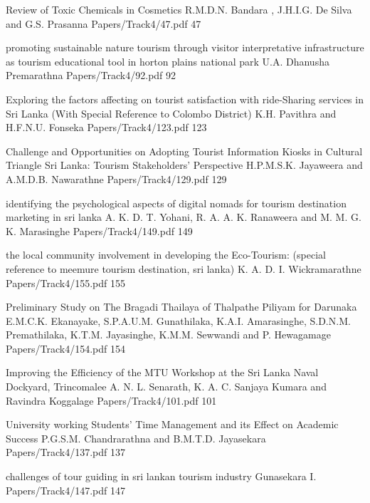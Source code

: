 \addpaper
{Review of Toxic Chemicals in Cosmetics}
{R.M.D.N. Bandara , J.H.I.G. De Silva and G.S. Prasanna}
{Papers/Track4/47.pdf}
{47}

\addpaper
{promoting sustainable nature tourism through visitor interpretative infrastructure as tourism educational tool in horton plains national park}
{U.A. Dhanusha Premarathna}
{Papers/Track4/92.pdf}
{92}

\addpaper
{Exploring the factors affecting on tourist satisfaction with ride-Sharing services in Sri Lanka (With Special Reference to Colombo District)}
{K.H. Pavithra and H.F.N.U. Fonseka}
{Papers/Track4/123.pdf}
{123}

\addpaper
{Challenge and Opportunities on Adopting Tourist Information Kiosks in Cultural Triangle Sri Lanka: Tourism Stakeholders' Perspective}
{H.P.M.S.K. Jayaweera and A.M.D.B. Nawarathne}
{Papers/Track4/129.pdf}
{129}

   \addpaper
{identifying the psychological aspects of digital nomads for tourism destination marketing in sri lanka}
 {A. K. D. T. Yohani, R. A. A. K. Ranaweera and M. M. G. K. Marasinghe} 
 {Papers/Track4/149.pdf}
   {149}


  \addpaper
{the local community involvement in developing
the Eco-Tourism: (special reference to meemure
tourism destination, sri lanka)}
 {K. A. D. I. Wickramarathne} 
 {Papers/Track4/155.pdf}
   {155}


\addpaper
{Preliminary Study on The Bragadi Thailaya of Thalpathe Piliyam for Darunaka}
{E.M.C.K. Ekanayake, S.P.A.U.M. Gunathilaka, K.A.I. Amarasinghe, S.D.N.M. Premathilaka, K.T.M. Jayasinghe, K.M.M. Sewwandi and P. Hewagamage}
{Papers/Track4/154.pdf}
{154}


   
   \addpaper
{Improving the Efficiency of the MTU Workshop at the Sri Lanka Naval Dockyard, Trincomalee}
 {A. N. L. Senarath, K. A. C. Sanjaya Kumara and Ravindra Koggalage} 
 {Papers/Track4/101.pdf}
   {101}



   \addpaper
{University working Students' Time Management and its Effect on Academic Success}
 {P.G.S.M. Chandrarathna and B.M.T.D. Jayasekara} 
 {Papers/Track4/137.pdf}
   {137}

   \addpaper
{challenges of tour guiding in sri lankan tourism
industry}
 {Gunasekara I.} 
 {Papers/Track4/147.pdf}
   {147}





